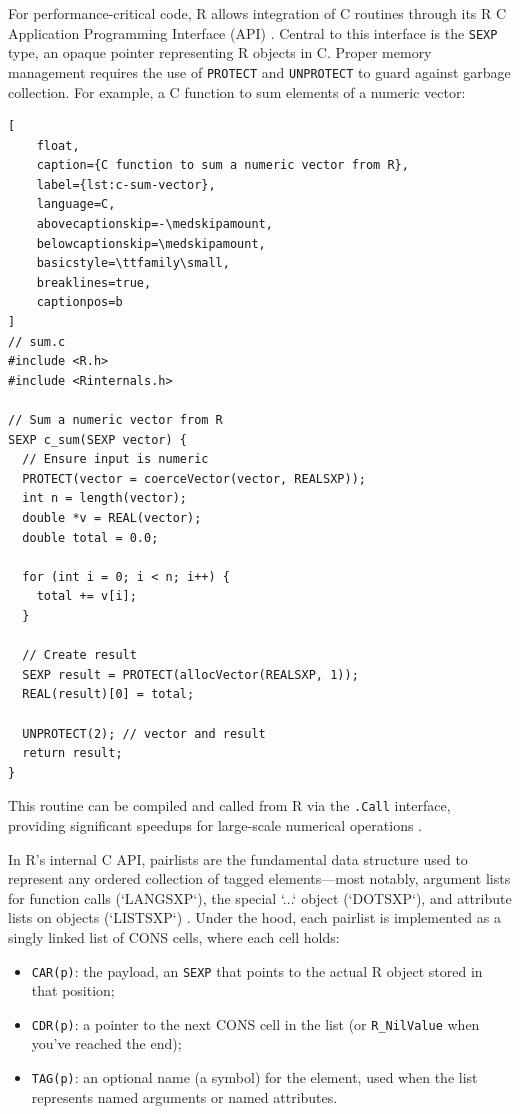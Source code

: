For performance-critical code, R allows integration of C routines through its R C Application Programming Interface (API) \cite{R-base}. Central to this interface is the \texttt{SEXP} type, an opaque pointer representing R objects in C. Proper memory management requires the use of \texttt{PROTECT} and \texttt{UNPROTECT} to guard against garbage collection. For example, a C function to sum elements of a numeric vector:

\begin{lstlisting}[
    float,
    caption={C function to sum a numeric vector from R},
    label={lst:c-sum-vector},
    language=C,
    abovecaptionskip=-\medskipamount,
    belowcaptionskip=\medskipamount,
    basicstyle=\ttfamily\small,
    breaklines=true,
    captionpos=b
]
// sum.c
#include <R.h>
#include <Rinternals.h>

// Sum a numeric vector from R
SEXP c_sum(SEXP vector) {
  // Ensure input is numeric
  PROTECT(vector = coerceVector(vector, REALSXP));
  int n = length(vector);
  double *v = REAL(vector);
  double total = 0.0;

  for (int i = 0; i < n; i++) {
    total += v[i];
  }

  // Create result
  SEXP result = PROTECT(allocVector(REALSXP, 1));
  REAL(result)[0] = total;

  UNPROTECT(2); // vector and result
  return result;
}
\end{lstlisting}


This routine can be compiled and called from R via the \texttt{.Call} interface, providing significant speedups for large-scale numerical operations \cite{R-base}.

In R’s internal C API, pairlists are the fundamental data structure used to represent any ordered collection of tagged elements—most notably, argument lists for function calls (`LANGSXP`), the special `...` object (`DOTSXP`), and attribute lists on objects (`LISTSXP`) \cite{wickham_pairlists}.  Under the hood, each pairlist is implemented as a singly linked list of CONS cells, where each cell holds:

\begin{itemize}
  \item \texttt{CAR(p)}: the payload, an \texttt{SEXP} that points to the actual R object stored in that position;
  \item \texttt{CDR(p)}: a pointer to the next CONS cell in the list (or \texttt{R\_NilValue} when you’ve reached the end);
  \item \texttt{TAG(p)}: an optional name (a symbol) for the element, used when the list represents named arguments or named attributes.
\end{itemize}

